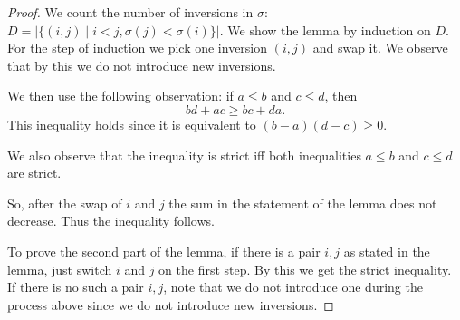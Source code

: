 \documentclass[11pt]{article}
\begin{document}
\begin{proof}
We count the number of inversions in $\sigma$: $D=|\{(i,j)\mid i<j, \sigma(j)<\sigma(i)\}|$. We show the lemma by induction on $D$.
For the step of induction we pick one inversion $(i,j)$ and swap it.
We observe that by this we do not introduce new inversions.
 
We then use the following observation: if $a\leq b$ and $c \leq d$, then
$$
bd + ac \geq bc + da.
$$
This inequality holds since it is equivalent to $ (b-a)(d-c)\geq 0$.

We also observe that the inequality is strict iff both inequalities $a\leq b$ and $c \leq d$ are strict.

So, after the swap of $i$ and $j$ the sum in the statement of the lemma does not decrease.
Thus the inequality follows.

To prove the second part of the lemma, if there is a pair $i,j$ as stated in the lemma, just switch $i$ and $j$ on the first step. By this we get the strict inequality.
If there is no such a pair $i,j$, note that we do not introduce one during the process above since we do not introduce new inversions.
\end{proof}
\end{document}
